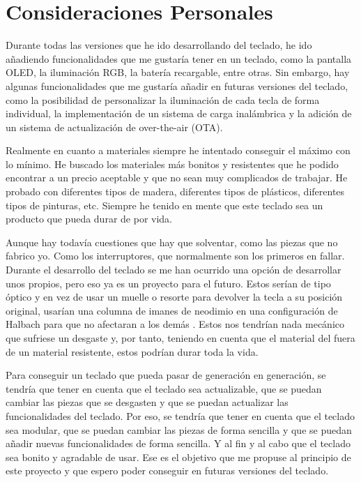 \section{Consideraciones Personales}
Durante todas las versiones que he ido desarrollando del teclado, he ido añadiendo funcionalidades que me gustaría tener en un teclado, como la pantalla \gls{OLED}, la iluminación RGB, la batería recargable, entre otras. Sin embargo, hay algunas funcionalidades que me gustaría añadir en futuras versiones del teclado, como la posibilidad de personalizar la iluminación de cada tecla de forma individual, la implementación de un sistema de carga inalámbrica y la adición de un sistema de actualización de  over-the-air (OTA).

Realmente en cuanto a materiales siempre he intentado conseguir el máximo con lo mínimo. He buscado los materiales más bonitos y resistentes que he podido encontrar a un precio aceptable y que no sean muy complicados de trabajar. He probado con diferentes tipos de madera, diferentes tipos de plásticos, diferentes tipos de pinturas, etc. Siempre he tenido en mente que este teclado sea un producto que pueda durar de por vida.

Aunque hay todavía cuestiones que hay que solventar, como las piezas que no fabrico yo. Como los interruptores, que normalmente son los primeros en fallar. Durante el desarrollo del teclado se me han ocurrido una opción de desarrollar unos  propios, pero eso ya es un proyecto para el futuro. Estos  serían de tipo óptico y en vez de usar un muelle o resorte para devolver la tecla a su posición original, usarían una columna de imanes de neodimio en una configuración de Halbach para que no afectaran a los demás . Estos nos tendrían nada mecánico que sufriese un desgaste y, por tanto, teniendo en cuenta que el material del  fuera de un material resistente, estos  podrían durar toda la vida.

Para conseguir un teclado que pueda pasar de generación en generación, se tendría que tener en cuenta que el teclado sea actualizable, que se puedan cambiar las piezas que se desgasten y que se puedan actualizar las funcionalidades del teclado. Por eso, se tendría que tener en cuenta que el teclado sea modular, que se puedan cambiar las piezas de forma sencilla y que se puedan añadir nuevas funcionalidades de forma sencilla. Y al fin y al cabo que el teclado sea bonito y agradable de usar. Ese es el objetivo que me propuse al principio de este proyecto y que espero poder conseguir en futuras versiones del teclado.
